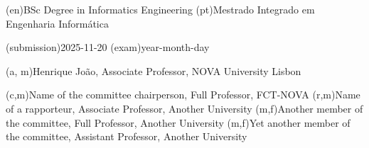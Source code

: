 \ntauthordegree(en){BSc Degree in Informatics Engineering}
\ntauthordegree(pt){Mestrado Integrado em Engenharia Informática}

\ntdate(submission){2025-11-20} 
\ntdate(exam){year-month-day}

(a, m){Henrique João, Associate Professor, NOVA University Lisbon}

(c,m){Name of the committee chairperson, Full Professor, FCT-NOVA}
(r,m){Name of a rapporteur, Associate Professor, Another University}
(m,f){Another member of the committee, Full Professor, Another University}
(m,f){Yet another member of the committee, Assistant Professor, Another University}
